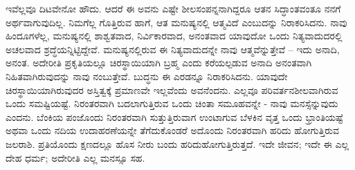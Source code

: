 ಇವೆಲ್ಲವೂ ದಿಟವೇನೋ ಹೌದು. ಆದರೆ ಈ ಅವನು ಎಷ್ಟೇ ಶೀಲಸಂಪನ್ನನಾಗಿದ್ದರೂ ಆತನ ಸಿದ್ಧಾಂತವಂತೂ ನನಗೆ ಅರ್ಥವಾಗುವುದಿಲ್ಲ. ನಿಮಗೆಲ್ಲ ಗೊತ್ತಿರುವ ಹಾಗೆ, ಆತ ಮನುಷ್ಯನಲ್ಲಿ ಆತ್ಮವಿದೆ ಎಂಬುದನ್ನು ನಿರಾಕರಿಸಿದನು. ನಾವು ಹಿಂದೂಗಳೆಲ್ಲ, ಮನುಷ್ಯನಲ್ಲಿ ಶಾಶ್ವತವಾದ, ನಿರ್ವಿಕಾರವಾದ, ಅನಂತವಾದ ಯಾವುದೋ ಒಂದು ನಿತ್ಯವಾದುದರಲ್ಲಿ ಅಚಲವಾದ ಶ್ರದ್ಧೆಯನ್ನಿಟ್ಟಿದ್ದೇವೆ. ಮನುಷ್ಯನಲ್ಲಿರುವ ಈ ನಿತ್ಯವಾದುದನ್ನೇ ನಾವು ಆತ್ಮವೆನ್ನುತ್ತೇವೆ – ಇದು ಅನಾದಿ, ಅನಂತ. ಅದೇರೀತಿ ಪ್ರಕೃತಿಯಲ್ಲೂ ಚಿರಸ್ಥಾಯಿಯಾಗಿ ಬ್ರಹ್ಮ ಎಂದು ಕರೆಯಲ್ಪಡುವ ಅನಾದಿ ಅನಂತವಾಗಿ ನಿಹಿತವಾಗಿರುವುದನ್ನು ನಾವು ನಂಬುತ್ತೇವೆ. ಬುದ್ಧನು ಈ ಎರಡನ್ನೂ ನಿರಾಕರಿಸಿದನು. ಯಾವುದೇ ಚಿರಸ್ಥಾಯಿಯಾಗಿರುವುದರ ಅಸ್ತಿತ್ವಕ್ಕೆ ಪ್ರಮಾಣವೇ ಇಲ್ಲವೆಂದು ಅವನೆಂದನು. ಎಲ್ಲವೂ ಪರಿವರ್ತನಶೀಲವಾಗಿರುವ ಒಂದು ಸಮಷ್ಟಿಯಷ್ಟೆ. ನಿರಂತರವಾಗಿ ಬದಲಾಗುತ್ತಿರುವ ಒಂದು ಚಿಂತಾ ಸಮೂಹವನ್ನೇ - ನಾವು ಮನಸ್ಸೆನ್ನುವುದು ಎಂದನು. ಬೆಂಕಿಯ ಪಂಜೊಂದು ನಿರಂತರವಾಗಿ ಸುತ್ತುತ್ತಿರುವಾಗ ಉಂಟಾಗುವ ಬೆಳಕಿನ ವೃತ್ತ ಒಂದು ಭ್ರಾಂತಿಯಷ್ಟೆ ಅಥವಾ ಒಂದು ನದಿಯ ಉದಾಹರಣೆಯನ್ನೇ ತೆಗೆದುಕೊಂಡರೆ ಅದೊಂದು ನಿರಂತರವಾಗಿ ಹರಿದು ಹೋಗುತ್ತಿರುವ ಜಲರಾಶಿ. ಪ್ರತಿಯೊಂದು ಕ್ಷಣದಲ್ಲೂ ಹೊಸ ನೀರು ಬಂದು ಹರಿದುಹೋಗುತ್ತಿರುತ್ತದೆ. ಇದೇ ಜೀವನ; ಇದೇ ಈ ಎಲ್ಲ ದೇಹ ಧರ್ಮ; ಅದೇರೀತಿ ಎಲ್ಲ ಮನಸ್ಸೂ ಸಹ.

